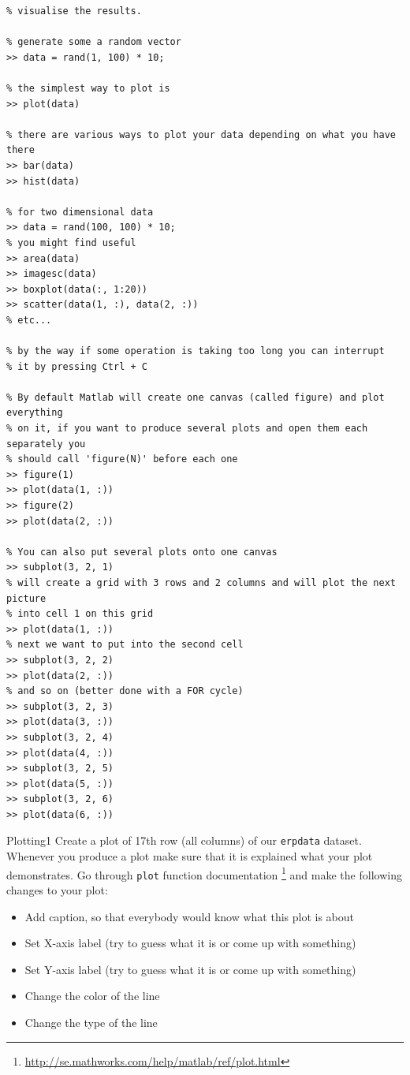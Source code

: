 \documentclass[a4paper,11pt]{article}
\begin{document}
%
%
\begin{lstlisting}[caption={Plotting}]
% One of the most important abilities in any data analysis task is the ability to
% visualise the results.

% generate some a random vector
>> data = rand(1, 100) * 10;

% the simplest way to plot is
>> plot(data)

% there are various ways to plot your data depending on what you have there
>> bar(data)
>> hist(data)

% for two dimensional data
>> data = rand(100, 100) * 10;
% you might find useful
>> area(data)
>> imagesc(data)
>> boxplot(data(:, 1:20))
>> scatter(data(1, :), data(2, :))
% etc...

% by the way if some operation is taking too long you can interrupt
% it by pressing Ctrl + C

% By default Matlab will create one canvas (called figure) and plot everything
% on it, if you want to produce several plots and open them each separately you
% should call 'figure(N)' before each one
>> figure(1)
>> plot(data(1, :))
>> figure(2)
>> plot(data(2, :))

% You can also put several plots onto one canvas
>> subplot(3, 2, 1)
% will create a grid with 3 rows and 2 columns and will plot the next picture
% into cell 1 on this grid
>> plot(data(1, :))
% next we want to put into the second cell
>> subplot(3, 2, 2)
>> plot(data(2, :))
% and so on (better done with a FOR cycle)
>> subplot(3, 2, 3)
>> plot(data(3, :))
>> subplot(3, 2, 4)
>> plot(data(4, :))
>> subplot(3, 2, 5)
>> plot(data(5, :))
>> subplot(3, 2, 6)
>> plot(data(6, :))

\end{lstlisting}


%
%
\begin{exercise}{3}{Plotting}{1}
Create a plot of 17th row (all columns) of our \texttt{erpdata} dataset. Whenever you produce a plot make sure that it is explained what your plot demonstrates. Go through \texttt{plot} function documentation \footnote{\url{http://se.mathworks.com/help/matlab/ref/plot.html}} and make the following changes to your plot:
\begin{itemize}
    \item Add caption, so that everybody would know what this plot is about
    \item Set X-axis label (try to guess what it is or come up with something)
    \item Set Y-axis label (try to guess what it is or come up with something)
    \item Change the color of the line
    \item Change the type of the line
\end{itemize}
\end{exercise}
\end{document}
